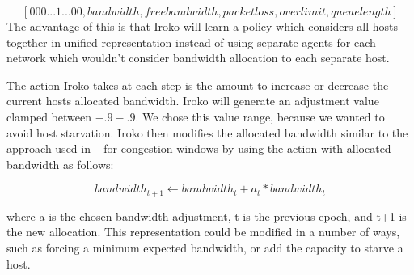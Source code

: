 \[ [0 0 0 ... 1 ... 0 0, bandwidth, free bandwidth, packet loss, overlimit, queue length ] \]
The advantage of this is that Iroko will learn a policy which considers all hosts together in unified representation instead of using separate agents for each network which wouldn't consider bandwidth allocation to each separate host.

The action Iroko takes at each step is the amount to increase or decrease the current hosts allocated bandwidth. Iroko will generate an adjustment value clamped between $-.9 - .9$. We chose this value range, because we wanted to avoid host starvation.  Iroko then modifies the allocated bandwidth similar to the approach used in ~\cite{remy} for congestion windows by using the action with allocated bandwidth as follows:

\[bandwidth_{t+1}   \leftarrow bandwidth_t +  a_t * bandwidth_t\]

where a is the chosen bandwidth adjustment, t is the previous epoch, and t+1 is the new allocation. This representation could be  modified in a number of ways, such as forcing a minimum expected bandwidth, or add the capacity to starve a host.



